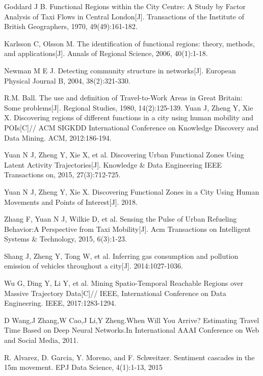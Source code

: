 \documentclass[runningheads]{llncs}
\begin{document}
\begin{thebibliography}{25}
Goddard J B. Functional Regions within the City Centre: A Study by Factor Analysis of Taxi Flows in Central London[J]. Transactions of the Institute of British Geographers, 1970, 49(49):161-182.
 
Karlsson C, Olsson M. The identification of functional regions: theory, methods, and applications[J]. Annals of Regional Science, 2006, 40(1):1-18.
   
Newman M E J. Detecting community structure in networks[J]. European Physical Journal B, 2004, 38(2):321-330.
   
R.M. Ball. The use and definition of Travel-to-Work Areas in Great Britain: Some problems[J]. Regional Studies, 1980, 14(2):125-139.
Yuan J, Zheng Y, Xie X. Discovering regions of different functions in a city using human mobility and POIs[C]// ACM SIGKDD International Conference on Knowledge Discovery and Data Mining. ACM, 2012:186-194.

Yuan N J, Zheng Y, Xie X, et al. Discovering Urban Functional Zones Using Latent Activity Trajectories[J]. Knowledge \& Data Engineering IEEE Transactions on, 2015, 27(3):712-725.
  
Yuan N J, Zheng Y, Xie X. Discovering Functional Zones in a City Using Human Movements and Points of Interest[J]. 2018.

Zhang F, Yuan N J, Wilkie D, et al. Sensing the Pulse of Urban Refueling Behavior:A Perspective from Taxi Mobility[J]. Acm Transactions on Intelligent Systems \& Technology, 2015, 6(3):1-23.
 
Shang J, Zheng Y, Tong W, et al. Inferring gas consumption and pollution emission of vehicles throughout a city[J]. 2014:1027-1036.

Wu G, Ding Y, Li Y, et al. Mining Spatio-Temporal Reachable Regions over Massive Trajectory Data[C]// IEEE, International Conference on Data Engineering. IEEE, 2017:1283-1294.
 
D Wang,J Zhang,W Cao,J Li,Y Zheng.When Will You Arrive? Estimating Travel Time Based on Deep Neural Networks.In International AAAI Conference on Web and Social Media, 2011.
 
R. Alvarez, D. Garcia, Y. Moreno, and F. Schweitzer. Sentiment cascades in the 15m movement. EPJ Data Science, 4(1):1-13, 2015


\end{thebibliography}
\end{document}
